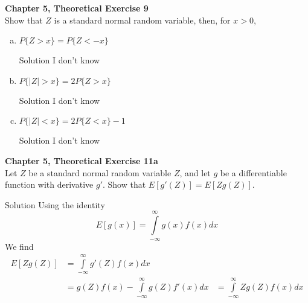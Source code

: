 \documentclass{article}
\begin{document}
\begin{spacing}{1.1}
\newpage
\begin{homeworkProblem}
  {\bf Chapter 5, Theoretical Exercise 9}\\
  Show that $Z$ is a standard normal random variable,
  then, for $x > 0$,
  \begin{enumerate}[(a)]
    \item $P\{ Z > x\} = P\{ Z < −x\}$
      \begin{homeworkSection}{Solution}
          I don't know
        
      \end{homeworkSection}
    \item $P\{ |Z| > x\} = 2 P\{ Z > x\}$
      \begin{homeworkSection}{Solution}
       I don't know 
      \end{homeworkSection}
    \item $P\{ |Z| < x \} = 2 P\{ Z < x \} − 1$
      \begin{homeworkSection}{Solution}
        I don't know 
      \end{homeworkSection}
    \end{enumerate}
\end{homeworkProblem}

\newpage
\begin{homeworkProblem}
  {\bf Chapter 5, Theoretical Exercise 11a}\\
  Let $Z$ be a standard normal random variable $Z$, and let 
  $g$ be a differentiable function with derivative $g'$.
  Show that $E[ g'(Z)] = E[Zg(Z)]$.
  \begin{homeworkSection}{Solution}
    Using the identity
      \[E[ g(x)] = \int\limits_{-\infty}^{\infty} g(x)f(x) dx \]
    We find
    \begin{align*}
      E[Zg(Z)]  &= \int\limits_{-\infty}^{\infty} g'(Z)f(x) dx\\
                &= g(Z)f(x) -  \int\limits_{-\infty}^{\infty} g(Z)f'(x) dx
                &= \int\limits_{-\infty}^{\infty} Zg(Z)f(x) dx
    \end{align*}
  \end{homeworkSection}
\end{homeworkProblem}


\end{spacing}
\end{document}
